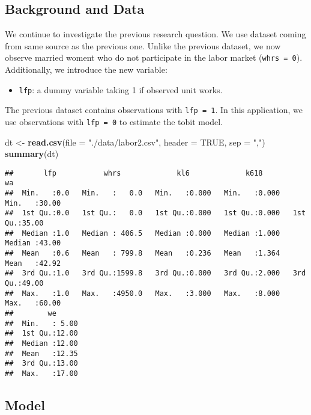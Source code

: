 \documentclass[
  12pt,
]{article}
\newenvironment{Shaded}{\begin{snugshade}}{\end{snugshade}}
\newcommand{\DataTypeTok}[1]{\textcolor[rgb]{0.13,0.29,0.53}{#1}}
\newcommand{\KeywordTok}[1]{\textcolor[rgb]{0.13,0.29,0.53}{\textbf{#1}}}
\newcommand{\NormalTok}[1]{#1}
\newcommand{\OtherTok}[1]{\textcolor[rgb]{0.56,0.35,0.01}{#1}}
\newcommand{\StringTok}[1]{\textcolor[rgb]{0.31,0.60,0.02}{#1}}
\providecommand{\tightlist}{%
  \setlength{\itemsep}{0pt}\setlength{\parskip}{0pt}}
\begin{document}
\hypertarget{background-and-data-1}{%
\subsection{Background and Data}\label{background-and-data-1}}

We continue to investigate the previous research question. We use
dataset coming from same source as the previous one. Unlike the previous
dataset, we now observe married woment who do not participate in the
labor market (\texttt{whrs\ =\ 0}). Additionally, we introduce the new
variable:

\begin{itemize}
\tightlist
\item
  \texttt{lfp}: a dummy variable taking 1 if observed unit works.
\end{itemize}

The previous dataset contains observations with \texttt{lfp\ =\ 1}. In
this application, we use observations with \texttt{lfp\ =\ 0} to
estimate the tobit model.

\begin{Shaded}
\begin{Highlighting}[]
\NormalTok{dt \textless{}{-}}\StringTok{ }\KeywordTok{read.csv}\NormalTok{(}\DataTypeTok{file =} \StringTok{"./data/labor2.csv"}\NormalTok{, }\DataTypeTok{header =} \OtherTok{TRUE}\NormalTok{,  }\DataTypeTok{sep =} \StringTok{","}\NormalTok{)}
\KeywordTok{summary}\NormalTok{(dt)}
\end{Highlighting}
\end{Shaded}

\begin{verbatim}
##       lfp           whrs             kl6             k618             wa       
##  Min.   :0.0   Min.   :   0.0   Min.   :0.000   Min.   :0.000   Min.   :30.00  
##  1st Qu.:0.0   1st Qu.:   0.0   1st Qu.:0.000   1st Qu.:0.000   1st Qu.:35.00  
##  Median :1.0   Median : 406.5   Median :0.000   Median :1.000   Median :43.00  
##  Mean   :0.6   Mean   : 799.8   Mean   :0.236   Mean   :1.364   Mean   :42.92  
##  3rd Qu.:1.0   3rd Qu.:1599.8   3rd Qu.:0.000   3rd Qu.:2.000   3rd Qu.:49.00  
##  Max.   :1.0   Max.   :4950.0   Max.   :3.000   Max.   :8.000   Max.   :60.00  
##        we       
##  Min.   : 5.00  
##  1st Qu.:12.00  
##  Median :12.00  
##  Mean   :12.35  
##  3rd Qu.:13.00  
##  Max.   :17.00
\end{verbatim}

\hypertarget{model-1}{%
\subsection{Model}\label{model-1}}
\end{document}
